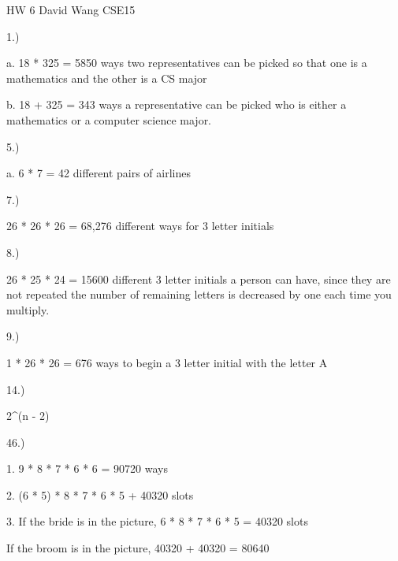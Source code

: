 HW 6
David Wang
CSE15

1.) 

a. 18 * 325 = 5850 ways two representatives can be picked so that one is a mathematics and the other is a CS major

b. 18 + 325 = 343 ways a representative can be picked who is either a mathematics or a computer science major.

5.)

a. 6 * 7 = 42 different pairs of airlines


7.)

26 * 26 * 26 = 68,276 different ways for 3 letter initials

8.)

26 * 25 * 24 = 15600 different 3 letter initials a person can have, since they are not repeated the number of remaining letters is decreased by one each time you multiply.

9.)

1 * 26 * 26 = 676 ways to begin a 3 letter initial with the letter A

14.)

2^(n - 2)

46.)

	1. 9 * 8 * 7 * 6 * 6 = 90720 ways

	2. (6 * 5) * 8 * 7 * 6 * 5 + 40320 slots

 	3. If the bride is in the picture, 6 * 8 * 7 * 6 * 5 = 40320 slots

	    If the broom is in the picture, 40320 + 40320 = 80640